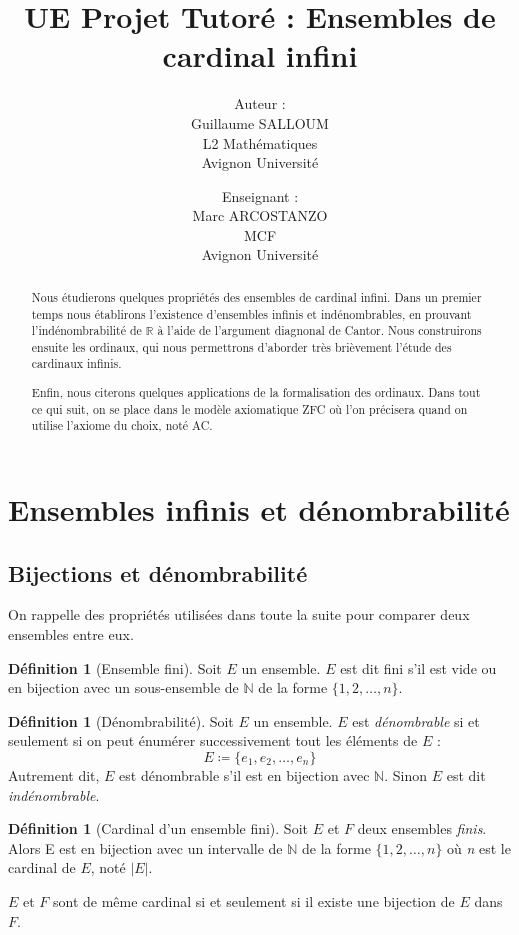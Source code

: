 \documentclass[french]{article}
\title{UE Projet Tutoré : Ensembles de cardinal infini}
\author{Auteur :\\
	Guillaume SALLOUM \\ 
	L2 Mathématiques \\ 
	Avignon Université
	\and
	Enseignant : \\
	Marc ARCOSTANZO \\
	MCF \\
	Avignon Université}
\date{}
\theoremstyle{definition}
\newtheorem{definition}[subsubsection]{Définition}
\theoremstyle{plain}
\theoremstyle{plain}
\theoremstyle{plain}
\theoremstyle{plain}
\theoremstyle{plain}
\begin{document}
\maketitle
\begin{abstract}
	Nous étudierons quelques propriétés des ensembles de cardinal infini. 
	Dans un premier temps nous établirons l'existence d'ensembles infinis et indénombrables, en prouvant l'indénombrabilité de \( \mathbb{R} \) à l'aide de l'argument diagnonal de Cantor. 
	Nous construirons ensuite les ordinaux, qui nous permettrons d'aborder très brièvement l'étude des cardinaux infinis. 
	
	Enfin, nous citerons quelques applications de la formalisation des ordinaux.
	Dans tout ce qui suit, on se place dans le modèle axiomatique ZFC où l'on précisera quand on utilise l'axiome du choix, noté AC. 
\end{abstract}


\tableofcontents
\clearpage
\section{Ensembles infinis et dénombrabilité}
\subsection{Bijections et dénombrabilité}

On rappelle des propriétés utilisées dans toute la suite pour comparer deux ensembles entre eux.

\begin{definition}[Ensemble fini]
	Soit \( E \) un ensemble.
	\( E \) est dit fini s'il est vide ou en bijection avec un sous-ensemble de \( \mathbb{N} \) de la forme \( \{1, 2, \ldots, n\} \).
\end{definition}

\begin{definition}[Dénombrabilité]
	Soit \( E \) un ensemble. \( E \) est \textit{dénombrable} si et seulement si on peut énumérer successivement tout les éléments de \( E \) :
\begin{equation*}
	E \coloneqq \{e_{1}, e_{2}, \ldots, e_{n}\} 
\end{equation*} 
	Autrement dit, \( E \) est dénombrable s'il est en bijection avec \( \mathbb{N} \). Sinon \( E \) est dit \textit{indénombrable}.
\end{definition}
\begin{definition}[Cardinal d'un ensemble fini]
	Soit \( E \) et \( F \) deux ensembles \textit{finis}.
	Alors E est en bijection avec un intervalle de \( \mathbb{N} \) de la forme \( \{1, 2, \ldots, n\} \) où \textit{n} est le cardinal de \( E \), noté \( |E| \).
	
	\( E \) et \( F \) sont de même cardinal si et seulement si il existe une bijection de \( E \) dans \( F \).
\
\end{definition}
\end{document}
